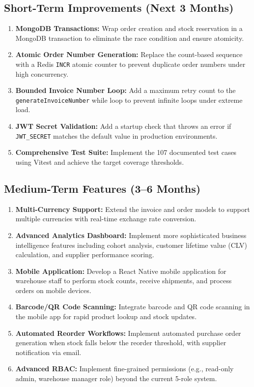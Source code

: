 ﻿\documentclass[12pt,a4paper]{report}
\begin{document}
\subsection{Short-Term Improvements (Next 3 Months)}

\begin{tcolorbox}[warningbox,title={Priority Improvements}]
\begin{enumerate}[leftmargin=1.5em]
  \item \textbf{MongoDB Transactions:} Wrap order creation and stock reservation in a MongoDB transaction to eliminate the race condition and ensure atomicity.
  \item \textbf{Atomic Order Number Generation:} Replace the count-based sequence with a Redis \texttt{INCR} atomic counter to prevent duplicate order numbers under high concurrency.
  \item \textbf{Bounded Invoice Number Loop:} Add a maximum retry count to the \texttt{generateInvoiceNumber} while loop to prevent infinite loops under extreme load.
  \item \textbf{JWT Secret Validation:} Add a startup check that throws an error if \texttt{JWT\_SECRET} matches the default value in production environments.
  \item \textbf{Comprehensive Test Suite:} Implement the 107 documented test cases using Vitest and achieve the target coverage thresholds.
\end{enumerate}
\end{tcolorbox}

\subsection{Medium-Term Features (3--6 Months)}

\begin{enumerate}[leftmargin=1.5em]
  \item \textbf{Multi-Currency Support:} Extend the invoice and order models to support multiple currencies with real-time exchange rate conversion.
  \item \textbf{Advanced Analytics Dashboard:} Implement more sophisticated business intelligence features including cohort analysis, customer lifetime value (CLV) calculation, and supplier performance scoring.
  \item \textbf{Mobile Application:} Develop a React Native mobile application for warehouse staff to perform stock counts, receive shipments, and process orders on mobile devices.
  \item \textbf{Barcode/QR Code Scanning:} Integrate barcode and QR code scanning in the mobile app for rapid product lookup and stock updates.
  \item \textbf{Automated Reorder Workflows:} Implement automated purchase order generation when stock falls below the reorder threshold, with supplier notification via email.
  \item \textbf{Advanced RBAC:} Implement fine-grained permissions (e.g., read-only admin, warehouse manager role) beyond the current 5-role system.
\end{enumerate}
\end{document}
